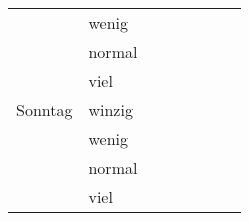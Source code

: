 \documentclass[11pt,a4paper]{article}
\begin{document}
\begin{tabular}{l|l|l|l|l|l|p{3cm}|p{3cm}}
             & wenig   &         &        &       &       & & \\
             & normal  &         &        &       &       & & \\
             & viel    &         &        &       &       & & \\
  \midrule
  Sonntag    & winzig  &         &        &       &       & & \\
             & wenig   &         &        &       &       & & \\
             & normal  &         &        &       &       & & \\
             & viel    &         &        &       &       & & \\
  \bottomrule
\end{tabular}
\end{document}
